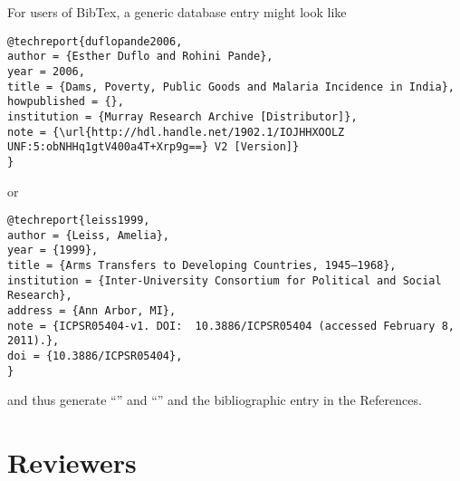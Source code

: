 \documentclass[AEJ]{AEA}
\begin{document}
For users of BibTex, a generic database entry might look like
\begin{verbatim}
@techreport{duflopande2006,
author = {Esther Duflo and Rohini Pande}, 
year = 2006, 
title = {Dams, Poverty, Public Goods and Malaria Incidence in India},
howpublished = {},
institution = {Murray Research Archive [Distributor]},
note = {\url{http://hdl.handle.net/1902.1/IOJHHXOOLZ UNF:5:obNHHq1gtV400a4T+Xrp9g==} V2 [Version]}
}
\end{verbatim}
or
\begin{verbatim}
@techreport{leiss1999,
author = {Leiss, Amelia},
year = {1999},
title = {Arms Transfers to Developing Countries, 1945–1968},
institution = {Inter-University Consortium for Political and Social Research}, 
address = {Ann Arbor, MI},
note = {ICPSR05404-v1. DOI:  10.3886/ICPSR05404 (accessed February 8, 2011).},
doi = {10.3886/ICPSR05404},
}
\end{verbatim}
and thus generate ``\cite{duflopande2006}'' and ``\cite{leiss1999}'' and the bibliographic entry in the References.




\appendix

\section{Reviewers}
\end{document}

